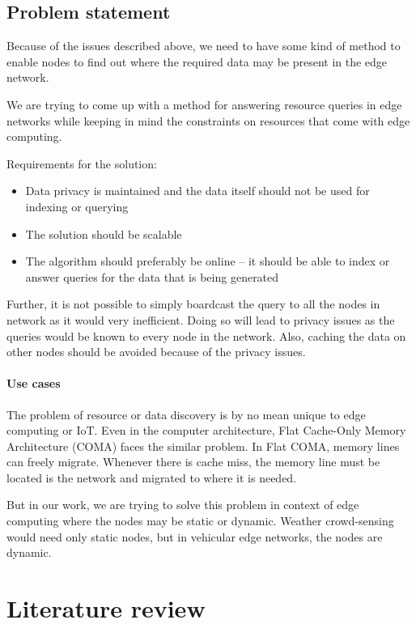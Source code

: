 \section{Problem statement}

Because of the issues described above, we need to have some kind of method to
enable nodes to find out where the required data may be present in the edge
network.

We are trying to come up with a method for answering resource queries in edge
networks while keeping in mind the constraints on resources that come with edge
computing.

Requirements for the solution:
\begin{itemize}
      \item Data privacy is maintained and the data itself should not be used
            for indexing or querying
      \item The solution should be scalable
      \item The algorithm should preferably be online -- it should be able to
            index or answer queries for the data that is being generated
\end{itemize}

Further, it is not possible to simply boardcast the query to all the nodes in
network as it would very inefficient. Doing so will lead to privacy issues as
the queries would be known to every node in the network. Also, caching the data
on other nodes should be avoided because of the privacy issues.

\subsubsection{Use cases}

The problem of resource or data discovery is by no mean unique to edge computing
or IoT. Even in the computer architecture, Flat Cache-Only Memory Architecture
(COMA) faces the similar problem. In Flat COMA, memory lines can freely migrate.
Whenever there is cache miss, the memory line must be located is the network and
migrated to where it is needed.
\cite{joseptorrellasCacheOnlyMemoryArchitecture}

But in our work, we are trying to solve this problem in context of edge
computing where the nodes may be static or dynamic. Weather crowd-sensing would
need only static nodes, but in vehicular edge networks, the nodes are dynamic.


\chapter{Literature review}

